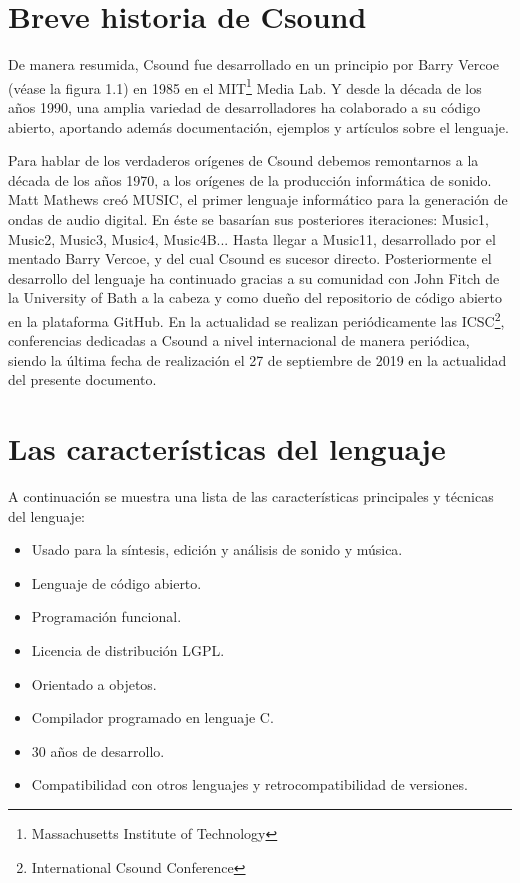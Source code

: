 \section{Breve historia de Csound}\label{sec:intro}

De manera resumida, Csound fue desarrollado en un principio por Barry Vercoe (véase la figura 1.1) en 1985 en el MIT\footnote{Massachusetts Institute of Technology} Media Lab. Y desde la década de los años 1990, una amplia variedad de desarrolladores ha colaborado a su código abierto, aportando además documentación, ejemplos y artículos sobre el lenguaje.


Para hablar de los verdaderos orígenes de Csound debemos remontarnos a la década de los años 1970, a los orígenes de la producción informática de sonido. 
Matt Mathews creó MUSIC, el primer lenguaje informático para la generación de ondas de audio digital. En éste se basarían sus posteriores iteraciones: Music1, Music2, Music3, Music4, Music4B... Hasta llegar a Music11, desarrollado por el mentado Barry Vercoe, y del cual Csound es sucesor directo.
Posteriormente el desarrollo del lenguaje ha continuado gracias a su comunidad con John Fitch de la University of Bath a la cabeza y como dueño del repositorio de código abierto en la plataforma GitHub.
En la actualidad se realizan periódicamente las ICSC\footnote{International Csound Conference}, conferencias dedicadas a Csound a nivel internacional de manera periódica, siendo la última fecha de realización el 27 de septiembre de 2019 en la actualidad del presente documento.

\section{Las características del lenguaje}\label{sec:intro}

A continuación se muestra una lista de las características principales y técnicas del lenguaje:
\begin{itemize}
 \item Usado para la síntesis, edición y análisis de sonido y música.
 \item Lenguaje de código abierto.
 \item Programación funcional.
 \item Licencia de distribución LGPL.
 \item Orientado a objetos.
 \item Compilador programado en lenguaje C.
 \item 30 años de desarrollo.
 \item Compatibilidad con otros lenguajes y retrocompatibilidad de versiones.
\end{itemize}



